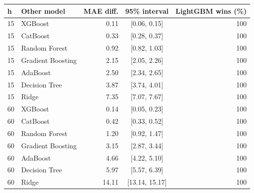 \begin{tabular}{llrcr}
\toprule
h & Other model & MAE diff. & 95\% interval & LightGBM wins (\%) \\
\midrule
15 & XGBoost & 0.11 & [0.06, 0.15] & 100 \\
15 & CatBoost & 0.33 & [0.28, 0.37] & 100 \\
15 & Random Forest & 0.92 & [0.82, 1.03] & 100 \\
15 & Gradient Boosting & 2.15 & [2.05, 2.26] & 100 \\
15 & AdaBoost & 2.50 & [2.34, 2.65] & 100 \\
15 & Decision Tree & 3.87 & [3.74, 4.01] & 100 \\
15 & Ridge & 7.35 & [7.07, 7.67] & 100 \\
60 & XGBoost & 0.14 & [0.05, 0.23] & 100 \\
60 & CatBoost & 0.42 & [0.33, 0.52] & 100 \\
60 & Random Forest & 1.20 & [0.92, 1.47] & 100 \\
60 & Gradient Boosting & 3.15 & [2.87, 3.44] & 100 \\
60 & AdaBoost & 4.66 & [4.22, 5.10] & 100 \\
60 & Decision Tree & 5.97 & [5.57, 6.39] & 100 \\
60 & Ridge & 14.11 & [13.14, 15.17] & 100 \\
\bottomrule
\end{tabular}
